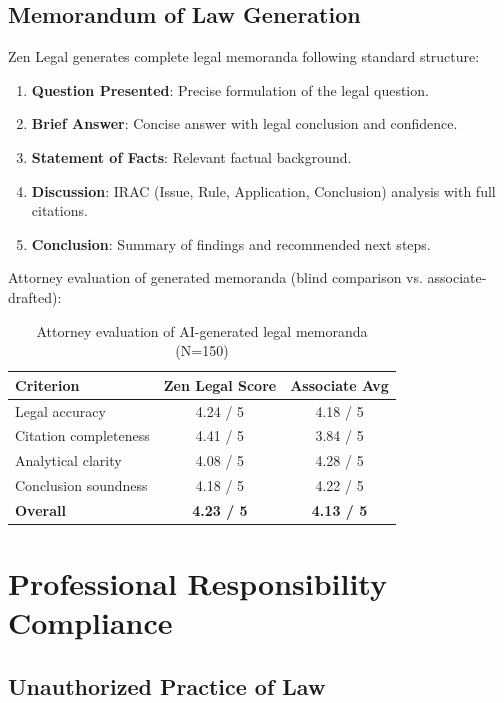 \documentclass[11pt,a4paper]{article}
\begin{document}
\subsection{Memorandum of Law Generation}

Zen Legal generates complete legal memoranda following standard structure:

\begin{enumerate}
  \item \textbf{Question Presented}: Precise formulation of the legal question.
  \item \textbf{Brief Answer}: Concise answer with legal conclusion and confidence.
  \item \textbf{Statement of Facts}: Relevant factual background.
  \item \textbf{Discussion}: IRAC (Issue, Rule, Application, Conclusion) analysis with full citations.
  \item \textbf{Conclusion}: Summary of findings and recommended next steps.
\end{enumerate}

Attorney evaluation of generated memoranda (blind comparison vs. associate-drafted):

\begin{table}[H]
\centering
\caption{Attorney evaluation of AI-generated legal memoranda (N=150)}
\label{tab:memo_eval}
\begin{tabular}{lcc}
\toprule
Criterion & Zen Legal Score & Associate Avg \\
\midrule
Legal accuracy & 4.24 / 5 & 4.18 / 5 \\
Citation completeness & 4.41 / 5 & 3.84 / 5 \\
Analytical clarity & 4.08 / 5 & 4.28 / 5 \\
Conclusion soundness & 4.18 / 5 & 4.22 / 5 \\
\textbf{Overall} & \textbf{4.23 / 5} & \textbf{4.13 / 5} \\
\bottomrule
\end{tabular}
\end{table}

\section{Professional Responsibility Compliance}

\subsection{Unauthorized Practice of Law}
\end{document}
